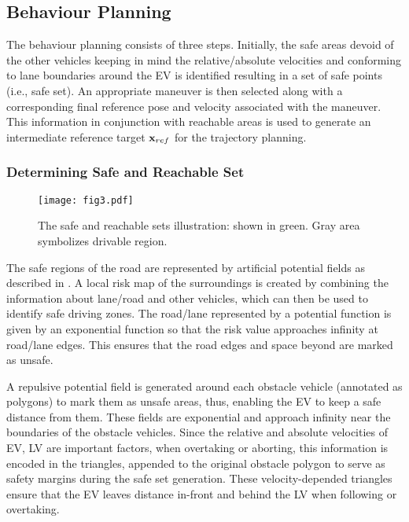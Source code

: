 \documentclass[letterpaper, 10 pt, conference]{ieeeconf}
\begin{document}
\subsection{Behaviour Planning}
\label{section:behaviourplanning}
The behaviour planning consists of three steps. Initially, the safe areas devoid of the other vehicles keeping in mind the relative/absolute velocities and conforming to lane boundaries around the EV is identified resulting in a set of safe points (i.e., safe set). An appropriate maneuver is then selected along with a corresponding final reference pose and velocity associated with the maneuver. This information in conjunction with reachable areas is used to generate an intermediate reference target $\textbf{\text{x}}_{ref}$ for the trajectory planning.\

\subsubsection{Determining Safe and Reachable Set}
\label{section:safeReachSet}

\begin{figure}[!t]
    \centering
    \texttt{[image: fig3.pdf]}
    \caption{The safe and reachable sets illustration: shown in green. Gray area symbolizes drivable region.}
    \label{fig:reachable_safe_set}
\end{figure}

The safe regions of the road are represented by artificial potential fields as described in  \cite{wolfArtificialPotentialFunctions2008}. A local risk map of the surroundings is created by combining the information about lane/road and other vehicles, which can then be used to identify safe driving zones. The road/lane represented by a potential function is given by an exponential function so that the risk value approaches infinity at road/lane edges. This ensures that the road edges and space beyond are marked as unsafe.\

A repulsive potential field  \cite{rowlinsonYukawaPotential1989} is generated around each obstacle vehicle (annotated as polygons) to mark them as unsafe areas, thus, enabling the EV to keep a safe distance from them. These fields are exponential and approach infinity near the boundaries of the obstacle vehicles. Since the relative and absolute velocities of EV, LV are important factors, when overtaking or aborting, this information is encoded in the triangles, appended to the original obstacle polygon to serve as safety margins during the safe set generation. These velocity-depended triangles ensure that the EV leaves distance in-front and behind the LV when following or overtaking.\
\end{document}
